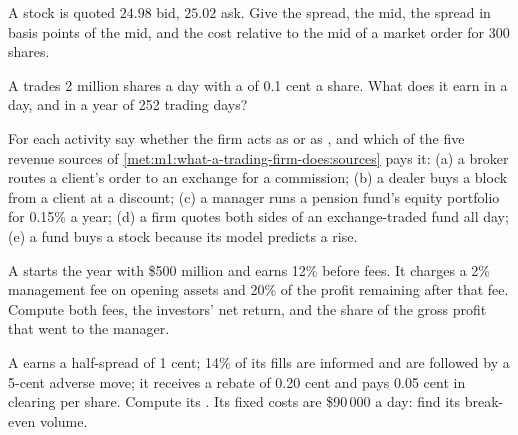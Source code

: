 \begin{exercise}[$\star$]\label{exo:m1:what-a-trading-firm-does:1}
A stock is quoted $24.98$ bid, $25.02$ ask. Give the spread, the mid, the
spread in basis points of the mid, and the cost relative to the mid of a
market order for 300 shares.
\end{exercise}

\begin{exercise}[$\star$]\label{exo:m1:what-a-trading-firm-does:2}
A  trades 2 million shares a day with a  of 0.1 cent
a share. What does it earn in a day, and in a year of 252 trading days?
\end{exercise}

\begin{exercise}[$\star$]\label{exo:m1:what-a-trading-firm-does:3}
For each activity say whether the firm acts as  or as , and
which of the five revenue sources of
\cref{met:m1:what-a-trading-firm-does:sources} pays it: (a) a broker routes
a client's order to an exchange for a commission; (b) a dealer buys a block
from a client at a discount; (c) a manager runs a pension fund's equity
portfolio for 0.15\% a year; (d) a firm quotes both sides of an
exchange-traded fund all day; (e) a fund buys a stock because its model
predicts a rise.
\end{exercise}

\begin{exercise}[$\star\star$]\label{exo:m1:what-a-trading-firm-does:4}
A  starts the year with \$500 million and earns 12\% before fees.
It charges a 2\% management fee on opening assets and 20\% of the profit
remaining after that fee. Compute both fees, the investors' net return, and
the share of the gross profit that went to the manager.
\end{exercise}

\begin{exercise}[$\star\star$]\label{exo:m1:what-a-trading-firm-does:5}
A  earns a half-spread of 1 cent; 14\% of its fills are
informed and are followed by a 5-cent adverse move; it receives a rebate of
0.20 cent and pays 0.05 cent in clearing per share. Compute its .
Its fixed costs are \$90\,000 a day: find its break-even volume.
\end{exercise}

